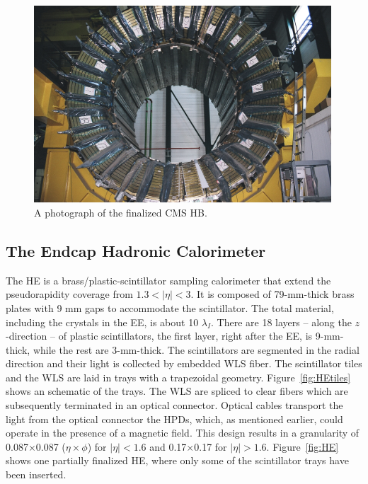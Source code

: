 \begin{figure}
 \centering
\includegraphics[width=0.99\textwidth]{CMS_DetectorFigures/hcal-HB.jpg}
\caption{A photograph of the finalized CMS HB.\label{fig:hcal}}
\end{figure}
\subsection{The Endcap Hadronic Calorimeter}
The HE is a brass/plastic-scintillator sampling calorimeter that extend
the pseudorapidity coverage from $1.3 < |\eta| < 3$. It is composed of
79-mm-thick brass plates with 9 mm gaps to accommodate the
scintillator. The total material, including the crystals in the EE, is
about 10 $\lambda_{I}$. There are 18 layers -- along the $z$-direction
-- of plastic scintillators, the first layer, right after the EE, is
9-mm-thick, while the rest are 3-mm-thick. The scintillators are
segmented in the radial direction and their light is collected by
embedded WLS fiber. The scintillator tiles and the WLS are laid in
trays with a trapezoidal geometry. Figure~\ref{fig:HEtiles} shows an
schematic of the trays. The WLS are spliced to clear fibers which are
subsequently terminated in an optical connector. Optical cables
transport the light from the optical connector the HPDs, which, as
mentioned earlier, could operate in the presence of a magnetic
field. This design results in a granularity of 0.087$\times$0.087
($\eta\times\phi$) for $|\eta| < 1.6$ and 0.17$\times$0.17 for $|\eta|
> 1.6$. Figure~\ref{fig:HE} shows one partially finalized HE, where
only some of the scintillator trays have been inserted.

